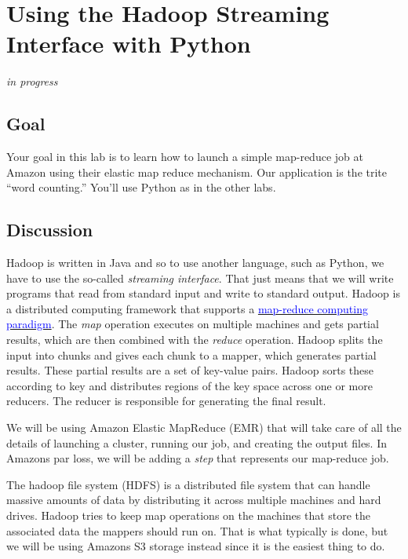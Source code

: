 \chapter{Using the Hadoop Streaming Interface with Python}

\begin{fullwidth}
{\em in progress}

\section{Goal}

Your goal in this lab is to learn how to launch a simple map-reduce job at Amazon using their elastic map reduce mechanism. Our application is the trite ``word counting.'' You'll use Python as in the other labs.

\section{Discussion}

Hadoop is written in Java and so to use another language, such as Python, we have to use the so-called {\em streaming interface}. That just means that we will write programs that read from standard input and write to standard output. Hadoop is a distributed computing framework that supports a \href{http://wiki.apache.org/hadoop/HadoopMapReduce}{\textcolor{blue}{map-reduce computing paradigm}}. The {\em map} operation executes on multiple machines and gets partial results, which are then combined with the {\em reduce} operation. Hadoop splits the input into chunks and gives each  chunk to a mapper, which generates partial results. These partial results are a set of key-value pairs. Hadoop  sorts these according to key and distributes regions of the key space across one or more reducers. The reducer is responsible for generating the final result. 

We will be using Amazon Elastic MapReduce (EMR) that will take care of all the details of launching a cluster, running our job, and creating the output files. In Amazons par loss, we will be adding a {\em step} that represents our map-reduce job.

The hadoop file system (HDFS) is a distributed file system that can handle massive amounts of data by distributing it across multiple machines and hard drives. Hadoop tries to keep map operations on the machines that store the associated data the mappers should run on. That is what typically is done, but we will be using Amazons S3 storage instead since it is the easiest thing to do.


\end{fullwidth}

